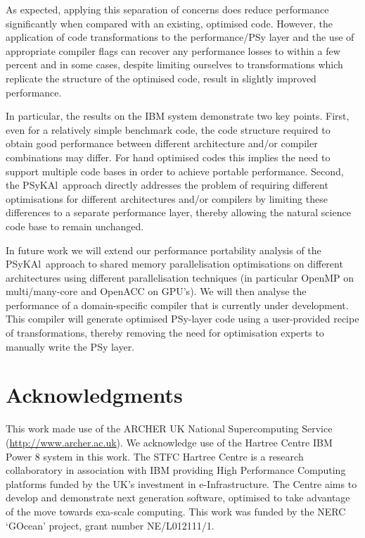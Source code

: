 \documentclass{IOS-Book-Article}
\newcommand{\psykal}{{PS}y{KA}l\ }
\begin{document}
As expected, applying this separation of concerns does reduce
performance significantly when compared with an existing, optimised
code. However, the application of code transformations to the
performance/PSy layer and the use of appropriate compiler flags can
recover any performance losses to within a few percent and in some
cases, despite limiting ourselves to transformations which replicate
the structure of the optimised code, result in slightly improved
performance.

In particular, the results on the IBM system demonstrate two key points.
%
First, even for a relatively simple
benchmark code, the code structure required to obtain good performance
between different architecture and/or compiler combinations may
differ. For hand optimised codes this implies the need to support
multiple code bases in order to achieve portable performance.
%
Second, the \psykal approach directly addresses the problem of
requiring different optimisations for different architectures and/or
compilers by limiting these differences to a separate performance
layer, thereby allowing the natural science code base to remain
unchanged.

In future work we will extend our performance portability analysis of
the \psykal approach to shared memory parallelisation optimisations on
different architectures using different parallelisation techniques (in
particular OpenMP on multi/many-core and OpenACC on GPU's).
%
We will then analyse the performance of a domain-specific compiler
that is currently under development. This compiler will generate
optimised PSy-layer code using a user-provided recipe of
transformations, thereby removing the need for optimisation experts to
manually write the PSy layer.

\section*{Acknowledgments}

This work made use of the ARCHER UK National Supercomputing Service
(\url{http://www.archer.ac.uk}). We acknowledge use of the Hartree
Centre IBM Power 8 system in this work. The STFC Hartree Centre is a
research collaboratory in association with IBM providing High
Performance Computing platforms funded by the UK's investment in
e-Infrastructure. The Centre aims to develop and demonstrate next
generation software, optimised to take advantage of the move towards
exa-scale computing. This work was funded by the NERC `GOcean' project,
grant number NE/L012111/1.



%
\end{document}
